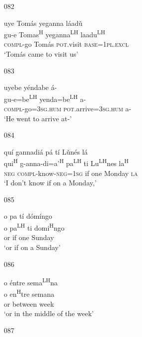 \begin{itemize}
\item[082]
 
\glll   uye Tom\'{a}s yeganna l\'{a}ad\v{u}\\
gu-e Tomas\textsuperscript{H} yeganna\textsuperscript{LH} laadu\textsuperscript{LH}\\
\textsc{compl}-go Tom\'{a}s \textsc{pot}.visit \textsc{base}=\textsc{1pl.excl}\\
\glt `Tom\'{a}s came to visit us'
 


\item[083]
 
\glll   uyebe y\'{e}ndabe \'{a}- \\
 gu-e=be\textsuperscript{LH} yenda=be\textsuperscript{LH} a- \\
\textsc{compl}-go=\textsc{3sg.hum} \textsc{pot}.arrive=\textsc{3sg.hum} a-\\
\glt `He went to arrive at-'
 


\item[084]
 
\glll   qu\'{i} gannadi\'{a} p\'{a} t\'{i} L\v{u}n\'{e}s l\'{a}\\
qui\textsuperscript{H} g-anna-di=a'\textsuperscript{H} pa\textsuperscript{LH} ti Lu\textsuperscript{LH}nes la\textsuperscript{H}\\
\textsc{neg} \textsc{compl}-know-\textsc{neg}=\textsc{1sg} if one Monday \textsc{la}\\
\glt `I don't know if on a Monday,'
 


\item[085]
 
\glll   o pa t\'{i} d\'{o}m\'{i}ngo\\
o pa\textsuperscript{LH} ti domi\textsuperscript{H}ngo \\
or if one Sunday\\
\glt `or if on a Sunday' 
 


\item[086]
 
\glll   o \'{e}ntre sema\textsuperscript{LH}na\\
o en\textsuperscript{H}tre semana\\
or between week\\
\glt `or in the middle of the week'
 


\item[087]
 

\end{itemize}
